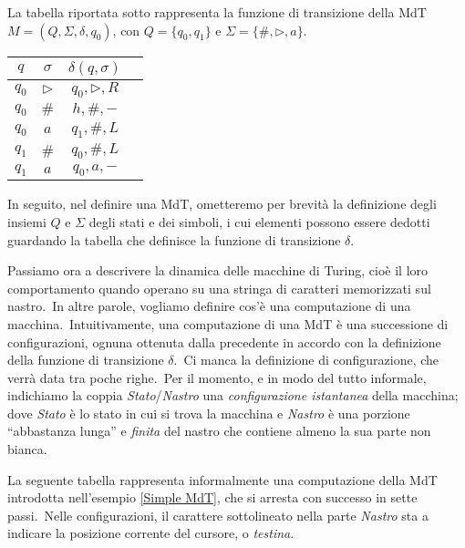 \begin{example}{\label{Simple MdT}}

    La tabella riportata sotto rappresenta la funzione di transizione della MdT $M = (Q, \Sigma, \delta, q_0)$, con $Q=\{q_0,q_1\}$ e $\Sigma=\{\#,\triangleright,a\}$.\

    \begin{table}[H]
        \centering
        \begin{tabular}{ |c|c|c|c| }
            \hline
            $q$   & $\sigma$         & $\delta(q,\sigma)$     \\\hline\hline
            $q_0$ & $\triangleright$ & $q_0,\triangleright,R$ \\
            $q_0$ & $\#$             & $h,\#,-$               \\
            $q_0$ & $a$              & $q_1,\#,L$             \\
            $q_1$ & $\#$             & $q_0,\#,L$             \\
            $q_1$ & $a$              & $q_0,a,-$              \\
            \hline
        \end{tabular}
    \end{table}

    \noindent In seguito, nel definire una MdT, ometteremo per brevità la definizione degli insiemi $Q$ e $\Sigma$ degli stati e dei simboli, i cui elementi possono essere dedotti guardando la tabella che definisce la funzione di transizione $\delta$.\
\end{example}

\noindent Passiamo ora a descrivere la dinamica delle macchine di Turing, cioè il loro comportamento quando operano su una stringa di caratteri memorizzati sul nastro.\
In altre parole, vogliamo definire cos'è una computazione di una macchina.\
Intuitivamente, una computazione di una MdT è una successione di configurazioni, ognuna ottenuta dalla precedente in accordo con la definizione della funzione di transizione $\delta$.\
Ci manca la definizione di configurazione, che verrà data tra poche righe.\
Per il momento, e in modo del tutto informale, indichiamo la coppia \textit{Stato}/\textit{Nastro} una \textit{configurazione istantanea} della macchina; dove \textit{Stato} è lo stato in cui si trova la macchina e \textit{Nastro} è una porzione ``abbastanza lunga'' e \textit{finita} del nastro che contiene almeno la sua parte non bianca.\

La seguente tabella rappresenta informalmente una computazione della MdT introdotta nell'esempio \ref{Simple MdT}, che si arresta con successo in sette passi.\
Nelle configurazioni, il carattere sottolineato nella parte \textit{Nastro} sta a indicare la posizione corrente del cursore, o \textit{testina}.\

